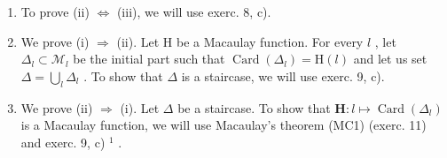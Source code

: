 \begin{enumerate}
\def\labelenumi{\alph{enumi})}
\item
  To prove (ii) \(\Leftrightarrow\) (iii), we will use exerc. 8, c).
\item
  We prove (i) \(\Rightarrow\) (ii). Let H be a Macaulay function. For every \(l\) , let \(\Delta_l \subset \mathcal{M}_l\) be the initial part such that \(\operatorname{Card}(\Delta_l) = \mathrm{H}(l)\) and let us set \(\Delta = \bigcup_{l} \Delta_l\) . To show that \(\Delta\) is a staircase, we will use exerc. 9, c).
\item
  We prove (ii) \(\Rightarrow\) (i). Let \(\Delta\) be a staircase. To show that \(\mathbf{H}: l \mapsto \operatorname{Card}(\Delta_l)\) is a Macaulay function, we will use Macaulay's theorem (MC1) (exerc. 11) and exerc. 9, c) \(^{1}\) .
\end{enumerate}
